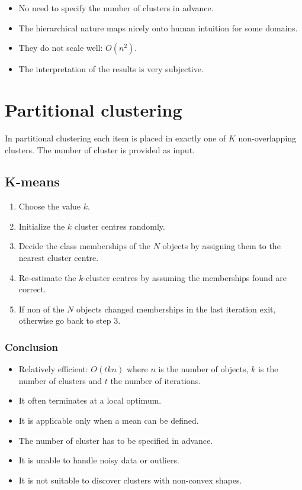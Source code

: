 	\begin{itemize}
		\item No need to specify the number of clusters in advance.
		\item The hierarchical nature maps nicely onto human intuition for some domains.
		\item They do not scale well: $O(n^2)$.
		\item The interpretation of the results is very subjective.
	\end{itemize}

\section{Partitional clustering}
In partitional clustering each item is placed in exactly one of $K$ non-overlapping clusters.
The number of cluster is provided as input.

	\subsection{K-means}

	\begin{enumerate}
		\item Choose the value $k$.
		\item Initialize the $k$ cluster centres randomly.
		\item Decide the class memberships of the $N$ objects by assigning them to the nearest cluster centre.
		\item Re-estimate the $k$-cluster centres by assuming the memberships found are correct.
		\item If non of the $N$ objects changed memberships in the last iteration exit, otherwise go back to step $3$.
	\end{enumerate}

		\subsubsection{Conclusion}

		\begin{itemize}
			\item Relatively efficient: $O(tkn)$ where $n$ is the number of objects, $k$ is the number of clusters and $t$ the number of iterations.
			\item It often terminates at a local optimum.
			\item It is applicable only when a mean can be defined.
			\item The number of cluster has to be specified in advance.
			\item It is unable to handle noisy data or outliers.
			\item It is not suitable to discover clusters with non-convex shapes.
		\end{itemize}

